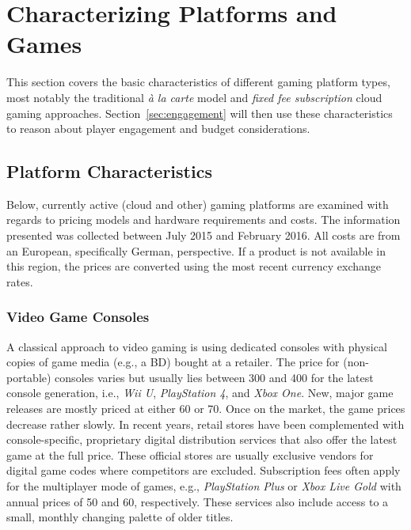 \section{Characterizing Platforms and Games}
\label{sec:background}

This section covers the basic characteristics of different gaming platform types, most notably the traditional  \textit{à la carte} model and \textit{fixed fee subscription} cloud gaming approaches. Section~\ref{sec:engagement} will then use these characteristics to reason about player engagement and budget considerations.

\subsection{Platform Characteristics}

Below, currently active (cloud and other) gaming platforms are examined with regards to pricing models and hardware requirements and costs. The information presented was collected between July 2015 and February 2016. All costs are from an European, specifically German, perspective. If a product is not available in this region, the prices are converted using the most recent currency exchange rates.

\subsubsection{Video Game Consoles}

A classical approach to video gaming is using dedicated consoles with physical copies of game media (e.g., a BD) bought at a retailer. The price for (non-portable) consoles varies but usually lies between \SI{300}[\EUR]{} and \SI{400}[\EUR]{} for the latest console generation, i.e., \textit{Wii U}, \textit{PlayStation 4}, and \textit{Xbox One}. New, major game releases are mostly priced at either \SI{60}[\EUR]{} or \SI{70}[\EUR]{}. Once on the market, the game prices decrease rather slowly. In recent years, retail stores have been complemented with console-specific, proprietary digital distribution services that also offer the latest game at the full price. These official stores are usually exclusive vendors for digital game codes where competitors are excluded.
Subscription fees often apply for the multiplayer mode of games, e.g., \textit{PlayStation Plus} or \textit{Xbox Live Gold} with annual prices of \SI{50}[\EUR]{} and \SI{60}[\EUR]{}, respectively. These services also include access to a small, monthly changing palette of older titles.


